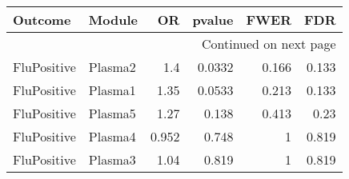 \documentclass[10pt]{article}
\begin{document}
\begin{longtable}{llrrrr}
\toprule
     Outcome &   Module &    OR &  pvalue &  FWER &   FDR \\
\midrule
\endhead
\midrule
\multicolumn{6}{r}{{Continued on next page}} \\
\midrule
\endfoot

\bottomrule
\endlastfoot
 FluPositive &  Plasma2 &   1.4 &  0.0332 & 0.166 & 0.133 \\
 FluPositive &  Plasma1 &  1.35 &  0.0533 & 0.213 & 0.133 \\
 FluPositive &  Plasma5 &  1.27 &   0.138 & 0.413 &  0.23 \\
 FluPositive &  Plasma4 & 0.952 &   0.748 &     1 & 0.819 \\
 FluPositive &  Plasma3 &  1.04 &   0.819 &     1 & 0.819 \\
\end{longtable}
\end{document}
